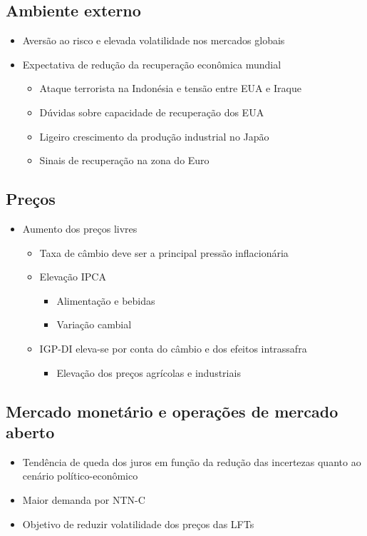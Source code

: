 \documentclass[11pt]{article}
\begin{document}
\subsection*{Ambiente externo}
\label{sec:orgd0ab7c0}
\begin{itemize}
\item Aversão ao risco e elevada volatilidade nos mercados globais
\item Expectativa de redução da recuperação econômica mundial
\begin{itemize}
\item Ataque terrorista na Indonésia e tensão entre EUA e Iraque
\item Dúvidas sobre capacidade de recuperação dos EUA
\item Ligeiro crescimento da produção industrial no Japão
\item Sinais de recuperação na zona do Euro
\end{itemize}
\end{itemize}
\subsection*{Preços}
\label{sec:org5e785cb}
\begin{itemize}
\item Aumento dos preços livres
\begin{itemize}
\item Taxa de câmbio deve ser a principal pressão inflacionária
\item Elevação IPCA
\begin{itemize}
\item Alimentação e bebidas
\item Variação cambial
\end{itemize}
\item IGP-DI eleva-se por conta do câmbio e dos efeitos intrassafra
\begin{itemize}
\item Elevação dos preços agrícolas e industriais
\end{itemize}
\end{itemize}
\end{itemize}
\subsection*{Mercado monetário e operações de mercado aberto}
\label{sec:org7234583}
\begin{itemize}
\item Tendência de queda dos juros em função da redução das incertezas quanto ao cenário político-econômico
\item Maior demanda por NTN-C
\item Objetivo de reduzir volatilidade dos preços das LFTs
\end{itemize}
\end{document}
